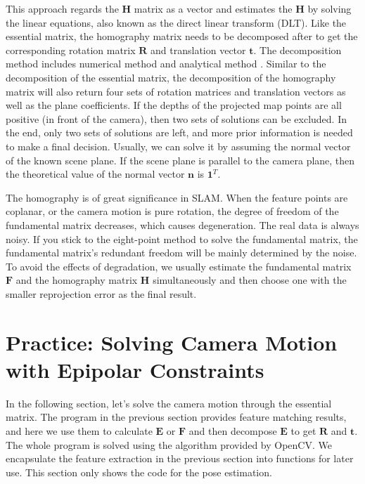 This approach regards the $\mathbf{H}$ matrix as a vector and estimates the $\mathbf{H}$ by solving the linear equations, also known as the direct linear transform (DLT). Like the essential matrix, the homography matrix needs to be decomposed after to get the corresponding rotation matrix $\mathbf{R}$ and translation vector $\mathbf{t}$. The decomposition method includes numerical method  {\cite{faugeras1988motion, Zhang1996}} and analytical method  {\cite{malis2007deeper}}. Similar to the decomposition of the essential matrix, the decomposition of the homography matrix will also return four sets of rotation matrices and translation vectors as well as the plane coefficients. If the depths of the projected map points are all positive (in front of the camera), then two sets of solutions can be excluded. In the end, only two sets of solutions are left, and more prior information is needed to make a final decision. Usually, we can solve it by assuming the normal vector of the known scene plane. If the scene plane is parallel to the camera plane, then the theoretical value of the normal vector $\mathbf{n}$ is $\mathbf{1}^T$.

The homography is of great significance in SLAM. When the feature points are coplanar, or the camera motion is pure rotation, the degree of freedom of the fundamental matrix decreases, which causes degeneration. The real data is always noisy. If you stick to the eight-point method to solve the fundamental matrix, the fundamental matrix's redundant freedom will be mainly determined by the noise. To avoid the effects of degradation, we usually estimate the fundamental matrix $\mathbf{F}$ and the homography matrix $\mathbf{H}$ simultaneously and then choose one with the smaller reprojection error as the final result.

\section{Practice: Solving Camera Motion with Epipolar Constraints}
In the following section, let's solve the camera motion through the essential matrix. The program in the previous section provides feature matching results, and here we use them to calculate $\mathbf{E}$ or $\mathbf{F}$ and then decompose $\mathbf{E}$ to get $\mathbf{R}$ and $\mathbf{t}$. The whole program is solved using the algorithm provided by OpenCV. We encapsulate the feature extraction in the previous section into functions for later use. This section only shows the code for the pose estimation.

